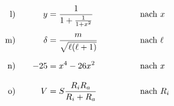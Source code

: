 \begin{exercise}
\begin{alignat*}{4}
      \exnum{l)}&\quad &            y&=\frac{1}{1+\frac{1}{1+x^{2}}}                                                        & \quad&\quad & \quad&\text{nach $x$}    \\
      \exnum{m)}&\quad &       \delta&=\frac{m}{\sqrt{\ell(\ell+1)}}                                                        & \quad&\quad & \quad&\text{nach $\ell$} \\
      \exnum{n)}&\quad &          -25&=x^{4}-26x^{2}                                                                        & \quad&\quad & \quad&\text{nach $x$}    \\
      \exnum{o)}&\quad &            V&=S\frac{R_{i}R_{a}}{R_{i}+R_{a}}                                                      & \quad&\quad & \quad&\text{nach $R_{i}$}
    \end{alignat*}
  \fi
\end{exercise}
